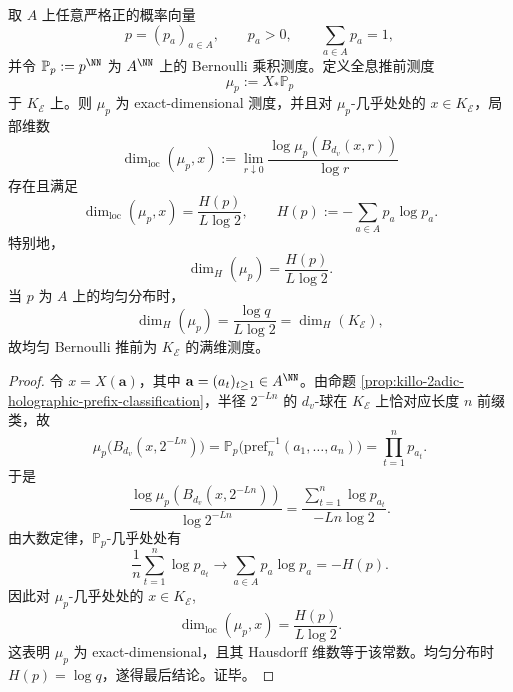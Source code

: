 \begin{theorem}\label{thm:killo-2adic-holographic-bernoulli-exact-dimension}
取 \(A\) 上任意严格正的概率向量
\[
p=(p_a)_{a\in A},\qquad p_a>0,\qquad \sum_{a\in A}p_a=1,
\]
并令 \(\mathbb P_p:=p^\NN\) 为 \(A^\NN\) 上的 Bernoulli 乘积测度。定义全息推前测度
\[
\mu_p:=X_*\mathbb P_p
\]
于 \(K_{\mathcal E}\) 上。则 \(\mu_p\) 为 exact-dimensional 测度，并且对 \(\mu_p\)-几乎处处的 \(x\in K_{\mathcal E}\)，局部维数
\[
\dim_{\mathrm{loc}}(\mu_p,x)
:=
\lim_{r\downarrow 0}
\frac{\log \mu_p(B_{d_v}(x,r))}{\log r}
\]
存在且满足
\[
\dim_{\mathrm{loc}}(\mu_p,x)=\frac{H(p)}{L\log 2},
\qquad
H(p):=-\sum_{a\in A}p_a\log p_a.
\]
特别地，
\[
\dim_H(\mu_p)=\frac{H(p)}{L\log 2}.
\]
当 \(p\) 为 \(A\) 上的均匀分布时，
\[
\dim_H(\mu_p)=\frac{\log q}{L\log 2}=\dim_H(K_{\mathcal E}),
\]
故均匀 Bernoulli 推前为 \(K_{\mathcal E}\) 的满维测度。
\end{theorem}
\begin{proof}
令 \(x=X(\mathbf a)\)，其中 \(\mathbf a=(a_t)_{t\ge 1}\in A^\NN\)。由命题 \ref{prop:killo-2adic-holographic-prefix-classification}，半径 \(2^{-Ln}\) 的 \(d_v\)-球在 \(K_{\mathcal E}\) 上恰对应长度 \(n\) 前缀类，故
\[
\mu_p\!\bigl(B_{d_v}(x,2^{-Ln})\bigr)
=
\mathbb P_p\!\bigl(\mathrm{pref}_n^{-1}(a_1,\dots,a_n)\bigr)
=
\prod_{t=1}^{n}p_{a_t}.
\]
于是
\[
\frac{\log \mu_p(B_{d_v}(x,2^{-Ln}))}{\log 2^{-Ln}}
=
\frac{\sum_{t=1}^{n}\log p_{a_t}}{-Ln\log 2}.
\]
由大数定律，\(\mathbb P_p\)-几乎处处有
\[
\frac1n\sum_{t=1}^{n}\log p_{a_t}\longrightarrow \sum_{a\in A}p_a\log p_a=-H(p).
\]
因此对 \(\mu_p\)-几乎处处的 \(x\in K_{\mathcal E}\),
\[
\dim_{\mathrm{loc}}(\mu_p,x)=\frac{H(p)}{L\log 2}.
\]
这表明 \(\mu_p\) 为 exact-dimensional，且其 Hausdorff 维数等于该常数。均匀分布时 \(H(p)=\log q\)，遂得最后结论。证毕。
\end{proof}

